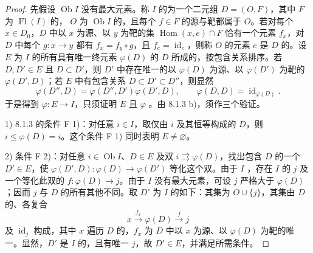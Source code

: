 \begin{proof}
先假设 $\operatorname{Ob}I$ 没有最大元素。称 $I$ 的为一个二元组 $D=(O,F)$，其中 $F$ 为 $\operatorname{Fl}(I)$ 的，
$O$ 为 $\operatorname{Ob}I$ 的，且每个 $f\in F$ 的源与靶都属于 $O$。若对每个 $x\in D_0$，$D$ 中以 $x$ 为源、以 $y$ 为靶的集 $\operatorname{Hom}(x,e)\cap F$ 恰有一个元素 $f_x$，对 $D$ 中每个 $g:x\to y$ 都有 $f_x=f_y\circ g$，且 $f_e=\operatorname{id}_e$，则称 $O$ 的元素 $e$ 是 $D$ 的。设 $E$ 为 $I$ 的所有具有唯一终元素 $\varphi(D)$ 的 $D$ 所成的，按包含关系排序。若 $D,D'\in E$ 且 $D\subset D'$，则 $D'$ 中存在唯一的以 $\varphi(D)$ 为源、以 $\varphi(D')$ 为靶的 $\varphi(D',D)$；若 $E$ 中有包含关系 $D\subset D'\subset D''$，则显然
\[
\varphi(D'',D)=\varphi(D'',D')\varphi(D',D),\qquad
\varphi(D,D)=\operatorname{id}_{\varphi(D)}.
\]
于是得到 $\varphi:E\to I$，只须证明 $E$ 且 $\varphi$ 。由 8.1.3 b)，须作三个验证。

1) 8.1.3 的条件 F 1)：对任意 $i\in I$，取仅由 $i$ 及其恒等构成的 $D$，则 $i\leq\varphi(D)=i$。这个条件 F 1) 同时表明 $E\ne\varnothing$。

2) 条件 F 2)：对任意 $i\in\operatorname{Ob}I$、$D\in E$ 及双 $i\rightrightarrows\varphi(D)$，找出包含 $D$ 的一个 $D'\in E$，使 $\varphi(D',D):\varphi(D)\to\varphi(D')$ 等化这个双。由于 $I$ ，存在 $I$ 的 $j$ 及一个等化此双的 $f:\varphi(D)\to j$。由于 $I$ 没有最大元素，可设 $j$ 严格大于 $\varphi(D)$；因而 $j$ 与 $D$ 的所有其他不同。取 $D'$ 为 $I$ 的如下：其集为 $O\cup\{j\}$，其集由 $D$ 的、各复合
\[
x\xrightarrow{f_x}\varphi(D)\xrightarrow f j
\]
及 $\operatorname{id}_j$ 构成，其中 $x$ 遍历 $D$ 的，$f_x$ 为 $D$ 中以 $x$ 为源、以 $\varphi(D)$ 为靶的唯一。显然，$D'$ 是 $I$ 的，且有唯一 $j$，故 $D'\in E$，并满足所需条件。


\end{proof}
